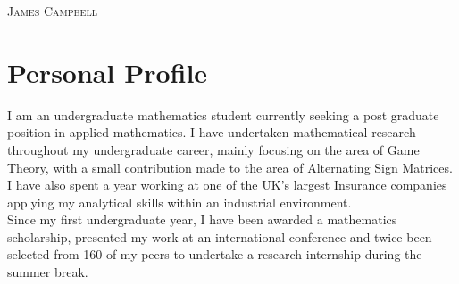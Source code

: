 \documentclass[a4paper]{article}
\begin{document}
\pagestyle{empty} %
\begin{multicols}{2}

\raggedright{\textsc{\Huge{James Campbell}}}\\
\columnbreak
{}

\end{multicols}
\section{Personal Profile}
I am an undergraduate mathematics student currently seeking a post graduate position in applied mathematics.
I have undertaken mathematical research throughout my undergraduate career, mainly focusing on the area of Game Theory, with a small contribution made to the area of Alternating Sign Matrices.
I have also spent a year working at one of the UK's largest Insurance companies applying my analytical skills within an industrial environment.
\\

Since my first undergraduate year, I have been awarded a mathematics scholarship, presented my work at an international conference and twice been selected from 160 of my peers to undertake a research internship during the summer break.
\end{document}
